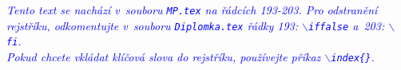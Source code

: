 ﻿\documentclass[a4paper,12pt]{report}                         %
\def \cestaJedna {01_Intro/}
\def \cestaDva {02_Chapter2/}
\def \cestaTri {03_Chapter3/}
\def \cestaCtyri {04_Chapter4/}
\def \cestaZaver {05_Concl/}
\def \cestaAP {A_Appendices/}
\def \cestaStyles {Styles/}
\begin{document}








\newpage\thispagestyle{empty}


\listoffigures
\cleardoublepage





\cleardoublepage
\def\appendixname{Příloha}
\begin{appendix}
\end{appendix}



\cleardoublepage {}
\printindex

\textcolor{blue}{\em Tento text se nachází v~souboru\/ {\rm\texttt{MP.tex} na řádcích 193-203}. Pro odstranění rejstříku, odkomentujte v~souboru {\rm \texttt{Diplomka.tex}} řádky 193\?: $\backslash$\texttt{iffalse} a~203\?:
$\backslash$\texttt{fi}.\\[2ex] Pokud chcete vkládat klíčová slova do rejstříku, používejte příkaz $\backslash$\texttt{index\{\}}.}
\end{document}
